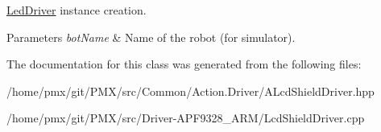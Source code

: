 \hyperlink{classLedDriver}{Led\+Driver} instance creation. 


\begin{DoxyParams}{Parameters}
{\em bot\+Name} & Name of the robot (for simulator). \\
\hline
\end{DoxyParams}


The documentation for this class was generated from the following files\+:\begin{DoxyCompactItemize}
\item 
/home/pmx/git/\+P\+M\+X/src/\+Common/\+Action.\+Driver/A\+Lcd\+Shield\+Driver.\+hpp\item 
/home/pmx/git/\+P\+M\+X/src/\+Driver-\/\+A\+P\+F9328\+\_\+\+A\+R\+M/Lcd\+Shield\+Driver.\+cpp\end{DoxyCompactItemize}
